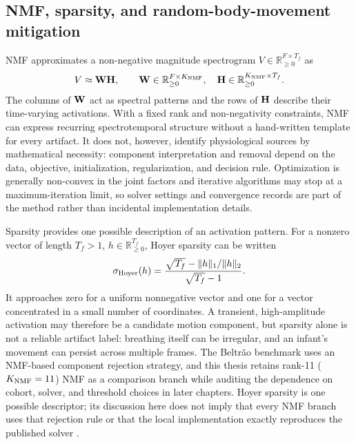 \subsection{NMF, sparsity, and random-body-movement mitigation}

NMF approximates a non-negative magnitude spectrogram $V\in\mathbb{R}_{\geq0}^{F\times T_f}$ as
\begin{equation}
  V\approx\mathbf{W}\mathbf{H},
  \qquad \mathbf{W}\in\mathbb{R}_{\geq0}^{F\times K_{\mathrm{NMF}}},
  \quad \mathbf{H}\in\mathbb{R}_{\geq0}^{K_{\mathrm{NMF}}\times T_f}.
  \label{eq:ch2_nmf}
\end{equation}
The columns of $\mathbf{W}$ act as spectral patterns and the rows of $\mathbf{H}$ describe their
time-varying activations. With a fixed rank and non-negativity constraints, NMF can express
recurring spectrotemporal structure without a hand-written template for every artifact. It does
not, however, identify physiological sources by mathematical necessity: component interpretation
and removal depend on the data, objective, initialization, regularization, and decision rule.
Optimization is generally non-convex in the joint factors and iterative algorithms may stop at a
maximum-iteration limit, so solver settings and convergence records are part of the method rather
than incidental implementation details.

Sparsity provides one possible description of an activation pattern. For a nonzero vector of
length $T_f>1$, $h\in\mathbb{R}_{\geq0}^{T_f}$, Hoyer sparsity can be written
\begin{equation}
  \sigma_{\mathrm{Hoyer}}(h)=
  \frac{\sqrt{T_f}-\lVert h\rVert_1/\lVert h\rVert_2}{\sqrt{T_f}-1}.
  \label{eq:ch2_hoyer}
\end{equation}
It approaches zero for a uniform nonnegative vector and one for a vector concentrated in a small
number of coordinates. A transient, high-amplitude activation may therefore be a candidate motion
component, but sparsity alone is not a reliable artifact label: breathing itself can be irregular,
and an infant's movement can persist across multiple frames. The Beltr\~ao benchmark uses an
NMF-based component rejection strategy, and this thesis retains rank-11 ($K_{\mathrm{NMF}}=11$) NMF as a
comparison branch while auditing the dependence on cohort, solver, and threshold choices in later
chapters. Hoyer sparsity is one possible descriptor; its discussion here does not imply that every
NMF branch uses that rejection rule or that the local implementation exactly reproduces the
published solver \citep{beltrao2022contactless,hoyer2004non}.

